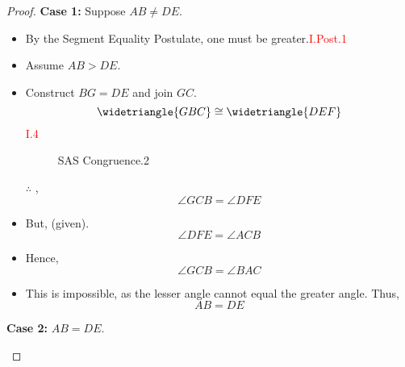 \begin{proof}

\textbf{Case 1:} Suppose $AB \neq DE$.

\begin{itemize}

\item[]

  \item By the Segment Equality Postulate, one must be greater.\hfill\textcolor{red}{I.Post.1}
  
  \item Assume $AB > DE$.
  
  \item Construct $BG = DE$ and join $GC$.
  \[\widetriangle{GBC} \cong \widetriangle{DEF}\]\hfill\textcolor{red}{ I.4}
  
  \begin{figure}[H]
	\begin{subfigure}{0.35\textwidth}
		\caption{}
	\end{subfigure}
	\begin{subfigure}{0.35\textwidth}	
		\caption{}
	\end{subfigure}
	\caption{SAS Congruence.2}
\end{figure}

  \item[$\therefore$], 
  \[\angle{GCB} = \angle{DFE}\]
  
  \item But, (given).
  \[\angle{DFE} = \angle{ACB}\]
  
  \item Hence, 
  \[\angle GCB = \angle BAC\]
  
  \clearpage
  
  \item This is impossible, as the lesser angle cannot equal the greater angle. Thus,
  \[AB = DE\]
  
\end{itemize}

\textbf{Case 2:} $AB = DE$.

\begin{itemize}


\end{itemize}
\end{proof}
